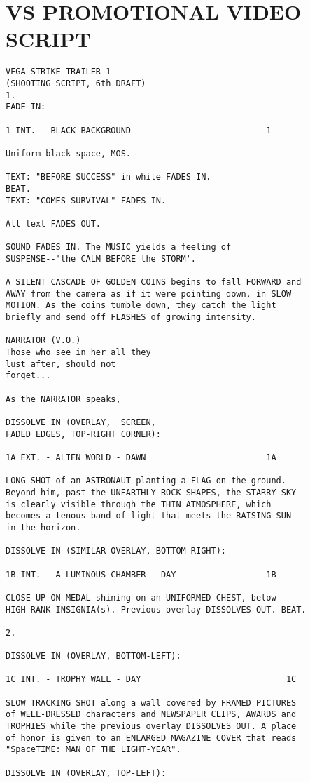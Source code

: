 \label{appendix:trailer}
\section{VS PROMOTIONAL VIDEO SCRIPT}
\begin{verbatim}
VEGA STRIKE TRAILER 1
(SHOOTING SCRIPT, 6th DRAFT)
1.
FADE IN:

1 INT. - BLACK BACKGROUND 							1

Uniform black space, MOS.

TEXT: "BEFORE SUCCESS" in white FADES IN.
BEAT.
TEXT: "COMES SURVIVAL" FADES IN.

All text FADES OUT.

SOUND FADES IN. The MUSIC yields a feeling of
SUSPENSE--'the CALM BEFORE the STORM'.

A SILENT CASCADE OF GOLDEN COINS begins to fall FORWARD and
AWAY from the camera as if it were pointing down, in SLOW
MOTION. As the coins tumble down, they catch the light
briefly and send off FLASHES of growing intensity.

NARRATOR (V.O.)
Those who see in her all they
lust after, should not
forget...

As the NARRATOR speaks,

DISSOLVE IN (OVERLAY,  SCREEN,
FADED EDGES, TOP-RIGHT CORNER):

1A EXT. - ALIEN WORLD - DAWN 						1A

LONG SHOT of an ASTRONAUT planting a FLAG on the ground.
Beyond him, past the UNEARTHLY ROCK SHAPES, the STARRY SKY
is clearly visible through the THIN ATMOSPHERE, which
becomes a tenous band of light that meets the RAISING SUN
in the horizon.

DISSOLVE IN (SIMILAR OVERLAY, BOTTOM RIGHT):

1B INT. - A LUMINOUS CHAMBER - DAY 					1B

CLOSE UP ON MEDAL shining on an UNIFORMED CHEST, below
HIGH-RANK INSIGNIA(s). Previous overlay DISSOLVES OUT. BEAT.

2.

DISSOLVE IN (OVERLAY, BOTTOM-LEFT):

1C INT. - TROPHY WALL - DAY 							1C

SLOW TRACKING SHOT along a wall covered by FRAMED PICTURES
of WELL-DRESSED characters and NEWSPAPER CLIPS, AWARDS and
TROPHIES while the previous overlay DISSOLVES OUT. A place
of honor is given to an ENLARGED MAGAZINE COVER that reads
"SpaceTIME: MAN OF THE LIGHT-YEAR".

DISSOLVE IN (OVERLAY, TOP-LEFT):


\end{verbatim}
